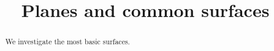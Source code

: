 \documentclass{ximera}
\title[Dig-In:]{Planes and common surfaces}
\begin{document}
\begin{abstract}
We investigate the most basic surfaces. 
\end{abstract}
\maketitle
\end{document}

